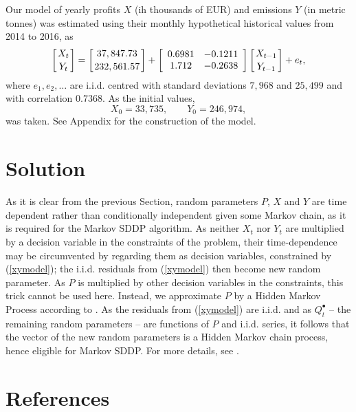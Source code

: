 \documentclass[3p,times]{elsarticle}
\begin{document}

Our model of yearly profits $X$ (ih thousands of EUR) and emissions $Y$ (in metric tonnes) was estimated using their monthly hypothetical historical values from 2014 to 2016, as 
\begin{equation}
\left[X_t
\atop
Y_t
\right]
=\left[37,847.73
\atop
232,561.57
\right]+
\left[
\begin{array}{cc}
0.6981 & -0.1211 \\
1.712 & -0.2638
\end{array}
\right]
\left[X_{t-1}
\atop
Y_{t-1}
\right]
 + e_t,
\end{equation}
where $e_1,e_2,\dots$ are i.i.d. centred with standard deviations $7,968$ and $25,499$ and with correlation $0.7368$. As the initial values,
$$
X_0 = 33,735,\qquad Y_0 = 246,974,
$$
was taken.  See Appendix for the construction of the model. 


		
\section{Solution}

As it is clear from the previous Section, random parameters $P$, $X$ and $Y$ are time dependent rather than conditionally independent given some Markov chain, as it is required for the Markov SDDP algorithm. As neither $X_t$ nor  $Y_t$ are multiplied by a decision variable in the constraints of the problem, their time-dependence may be circumvented by regarding them as decision variables, constrained by (\ref{xymodel}); the i.i.d. residuals from (\ref{xymodel}) then become new random parameter. As $P$ is multiplied by other decision variables in the constraints, this trick cannot be used here. Instead, we approximate $P$ by a Hidden Markov Process according to  \citep{smid2019solution}. As the residuals from (\ref{xymodel}) are i.i.d. and as  $Q^\bullet_t$ -- the remaining random parameters -- are functions of $P$ and i.i.d. series, it follows that the vector of the new random parameters is a Hidden Markov chain process, hence eligible for Markov SDDP. For more details, see \citet{smid2019solution}.




\section*{References}


\end{document}
